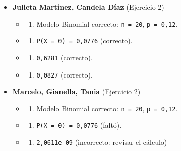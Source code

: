 \documentclass[
  spanish,
  letterpaper,
  DIV=11,
  numbers=noendperiod]{scrreprt}
\providecommand{\tightlist}{%
  \setlength{\itemsep}{0pt}\setlength{\parskip}{0pt}}
\begin{document}
\begin{itemize}
\item
  \textbf{Julieta Martínez, Candela Díaz} (Ejercicio 2)

  \begin{itemize}
  \tightlist
  \item
    \begin{enumerate}
    \def\labelenumi{\alph{enumi})}
    \tightlist
    \item
      Modelo Binomial correcto: \texttt{n\ =\ 20}, \texttt{p\ =\ 0,12}.
    \end{enumerate}
  \item
    \begin{enumerate}
    \def\labelenumi{\alph{enumi})}
    \setcounter{enumi}{1}
    \tightlist
    \item
      \texttt{P(X\ =\ 0)\ =\ 0,0776} (correcto).
    \end{enumerate}
  \item
    \begin{enumerate}
    \def\labelenumi{\alph{enumi})}
    \setcounter{enumi}{2}
    \tightlist
    \item
      \texttt{0,6281} (correcto).
    \end{enumerate}
  \item
    \begin{enumerate}
    \def\labelenumi{\alph{enumi})}
    \setcounter{enumi}{3}
    \tightlist
    \item
      \texttt{0,0827} (correcto).
    \end{enumerate}
  \end{itemize}
\end{itemize}

\begin{itemize}
\tightlist
\item
  \textbf{Marcelo, Gianella, Tania} (Ejercicio 2)

  \begin{itemize}
  \tightlist
  \item
    \begin{enumerate}
    \def\labelenumi{\alph{enumi})}
    \tightlist
    \item
      Modelo Binomial correcto: \texttt{n\ =\ 20}, \texttt{p\ =\ 0,12}.
    \end{enumerate}
  \item
    \begin{enumerate}
    \def\labelenumi{\alph{enumi})}
    \setcounter{enumi}{1}
    \tightlist
    \item
      \texttt{P(X\ =\ 0)\ =\ 0,0776} (faltó).
    \end{enumerate}
  \item
    \begin{enumerate}
    \def\labelenumi{\alph{enumi})}
    \setcounter{enumi}{2}
    \tightlist
    \item
      \texttt{2,0611e-09} (incorrecto: revisar el cálculo)
    \end{enumerate}
  \end{itemize}
\end{itemize}
\end{document}
